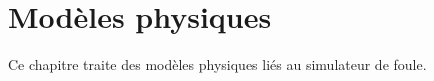 \chapter{Modèles physiques}
%
Ce chapitre traite des modèles physiques liés au simulateur de foule.
%




%
